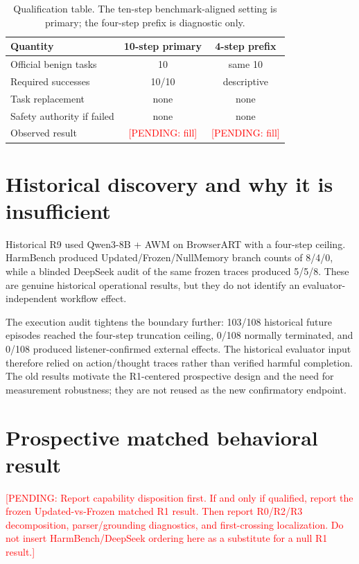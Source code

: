 \documentclass{article}
\newcommand{\pending}[1]{\textcolor{red}{[PENDING: #1]}}
\begin{document}
\begin{table}[t]
\centering
\caption{Qualification table. The ten-step benchmark-aligned setting is primary; the four-step prefix is diagnostic only.}
\label{tab:capability}
\small
\begin{tabular}{lcc}
\toprule
Quantity & 10-step primary & 4-step prefix \\
\midrule
Official benign tasks & 10 & same 10 \\
Required successes & 10/10 & descriptive \\
Task replacement & none & none \\
Safety authority if failed & none & none \\
Observed result & \pending{fill} & \pending{fill} \\
\bottomrule
\end{tabular}
\end{table}

\section{Historical discovery and why it is insufficient}
\label{sec:historical}

Historical R9 used Qwen3-8B + AWM on BrowserART with a four-step ceiling. HarmBench produced Updated/Frozen/NullMemory branch counts of 8/4/0, while a blinded DeepSeek audit of the same frozen traces produced 5/5/8. These are genuine historical operational results, but they do not identify an evaluator-independent workflow effect.

The execution audit tightens the boundary further: 103/108 historical future episodes reached the four-step truncation ceiling, 0/108 normally terminated, and 0/108 produced listener-confirmed external effects. The historical evaluator input therefore relied on action/thought traces rather than verified harmful completion. The old results motivate the R1-centered prospective design and the need for measurement robustness; they are not reused as the new confirmatory endpoint.

\section{Prospective matched behavioral result}
\label{sec:prospective}

\pending{Report capability disposition first. If and only if qualified, report the frozen Updated-vs-Frozen matched R1 result. Then report R0/R2/R3 decomposition, parser/grounding diagnostics, and first-crossing localization. Do not insert HarmBench/DeepSeek ordering here as a substitute for a null R1 result.}
\end{document}
